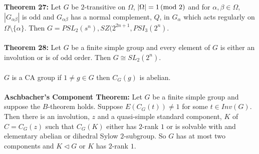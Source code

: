 \\
\\
{\bf Theorem 27:} Let $G$ be $2$-transitive on $\Omega$, $|\Omega| = 1 \thinspace \textnormal{(mod } 2 \textnormal{)}$ and for
$\alpha, \beta \in \Omega$, $|G_{\alpha \beta}|$ is odd and $G_{\alpha \beta}$ has a normal
complement, $Q$, in $G_{\alpha}$ which acts regularly on $\Omega \setminus \{ \alpha \}$.
Then $G = PSL_2(s^n), SZ(2^{2n+1}, PSI_3(2^n)$.
\\
\\
{\bf Theorem 28:} Let $G$ be a finite simple group and every element of $G$ is either an involution
or is of odd order.  Then $G \cong SL_2(2^n)$.
\\
\\
$G$ is a CA group if $1 \ne g \in G$ then $C_G(g)$ is abelian.
\\
\\
{\bf Aschbacher's Component Theorem:} Let $G$ be a finite simple group and suppose the
$B$-theorem holds.  Suppose $E(C_G(t)) \ne 1$ for some $t \in Inv(G)$.  Then there is
an involution, $z$ and a quasi-simple standard component, $K$ of $C=C_G(z)$ such that
$C_G(K)$ either has $2$-rank $1$ or is solvable with and elementary abelian or dihedral
Sylow $2$-subgroup.  So $G$ has at most two components and $K \lhd G$ or $K$  has $2$-rank $1$.

